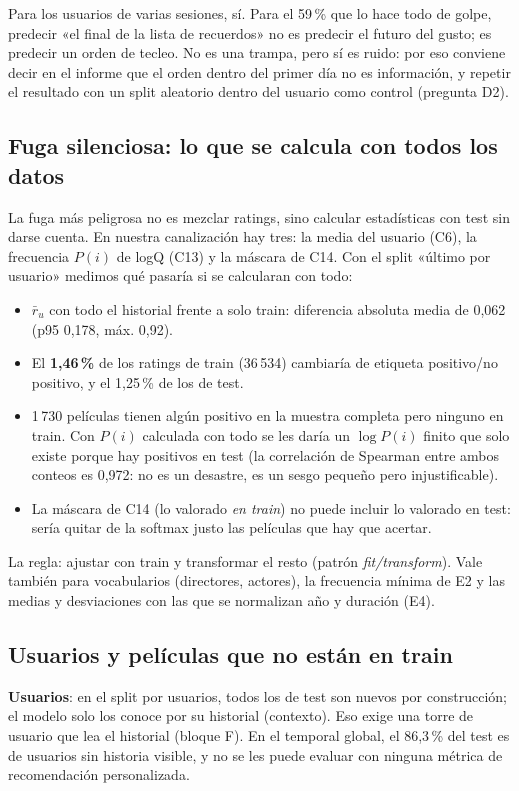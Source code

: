\documentclass[a4paper,11pt]{article}
\begin{document}
\begin{ojo}
Para los usuarios de varias sesiones, sí. Para el 59\,\% que lo hace todo de golpe, predecir «el final de la lista de
recuerdos» no es predecir el futuro del gusto; es predecir un orden de tecleo. No es una trampa, pero sí es ruido: por eso
conviene decir en el informe que el orden dentro del primer día no es información, y repetir el resultado con un split
aleatorio dentro del usuario como control (pregunta D2).
\end{ojo}

\subsection{Fuga silenciosa: lo que se calcula con todos los datos}
La fuga más peligrosa no es mezclar ratings, sino calcular estadísticas con test sin darse cuenta. En nuestra
canalización hay tres: la media del usuario (C6), la frecuencia $P(i)$ de logQ (C13) y la máscara de C14. Con el split
«último por usuario» medimos qué pasaría si se calcularan con todo:
\begin{itemize}
  \item $\bar r_u$ con todo el historial frente a solo train: diferencia absoluta media de 0,062 (p95 0,178, máx. 0,92).
  \item El \textbf{1,46\,\%} de los ratings de train (36\,534) cambiaría de etiqueta positivo/no positivo, y el 1,25\,\% de
        los de test.
  \item 1\,730 películas tienen algún positivo en la muestra completa pero ninguno en train. Con $P(i)$ calculada con todo
        se les daría un $\log P(i)$ finito que solo existe porque hay positivos en test (la correlación de Spearman entre
        ambos conteos es 0,972: no es un desastre, es un sesgo pequeño pero injustificable).
  \item La máscara de C14 (lo valorado \emph{en train}) no puede incluir lo valorado en test: sería quitar de la softmax
        justo las películas que hay que acertar.
\end{itemize}
La regla: ajustar con train y transformar el resto (patrón \emph{fit/transform}). Vale también para vocabularios
(directores, actores), la frecuencia mínima de E2 y las medias y desviaciones con las que se normalizan año y duración (E4).

\subsection{Usuarios y películas que no están en train}
\textbf{Usuarios}: en el split por usuarios, todos los de test son nuevos por construcción; el modelo solo los conoce por su historial
(contexto). Eso exige una torre de usuario que lea el historial (bloque F). En el temporal global, el 86,3\,\% del test es de
usuarios sin historia visible, y no se les puede evaluar con ninguna métrica de recomendación personalizada.
\end{document}
